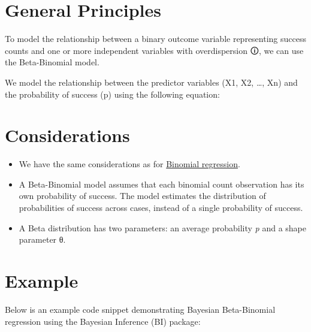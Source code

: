 \documentclass[
  letterpaper,
  DIV=11,
  numbers=noendperiod]{scrreprt}
\begin{document}
\section{General Principles}\label{general-principles-5}

To model the relationship between a binary outcome variable representing
success counts and one or more independent variables with
\label{overdispersion}{{overdispersion 🛈}}, we can use
the Beta-Binomial model.

We model the relationship between the predictor variables (X1, X2,
\ldots, Xn) and the probability of success (p) using the following
equation:

\section{Considerations}\label{considerations-5}

\begin{tcolorbox}[enhanced jigsaw, toptitle=1mm, opacityback=0, titlerule=0mm, breakable, bottomrule=.15mm, colframe=quarto-callout-caution-color-frame, arc=.35mm, coltitle=black, left=2mm, opacitybacktitle=0.6, leftrule=.75mm, toprule=.15mm, rightrule=.15mm, bottomtitle=1mm, colbacktitle=quarto-callout-caution-color!10!white, title=\textcolor{quarto-callout-caution-color}{\faFire}\hspace{0.5em}{Caution}, colback=white]

\begin{itemize}
\item
  We have the same considerations as for
  \href{5.\%20Binomial\%20model.qmd}{Binomial regression}.
\item
  A Beta-Binomial model assumes that each binomial count observation has
  its own probability of success. The model estimates the distribution
  of probabilities of success across cases, instead of a single
  probability of success.
\item
  A Beta distribution has two parameters: an average probability
  \emph{p} and a shape parameter θ.
\end{itemize}

\end{tcolorbox}

\section{Example}\label{example-5}

Below is an example code snippet demonstrating Bayesian Beta-Binomial
regression using the Bayesian Inference (BI) package:
\end{document}
